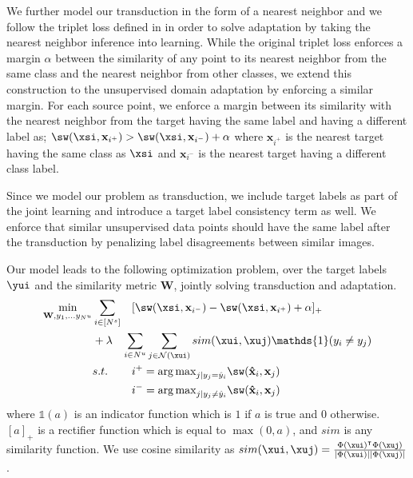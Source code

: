 We further model our transduction in the form of a nearest neighbor and we follow the triplet loss defined in \cite{lmnn} in order to solve adaptation by taking the nearest neighbor inference into learning. While the original triplet loss \cite{lmnn} enforces a margin $\alpha$ between the similarity of any point to its nearest neighbor from the same class and the nearest neighbor from other classes, we extend this construction to the unsupervised domain adaptation by enforcing a similar margin. For each source point, we enforce a margin between its similarity with the nearest neighbor from the target having the same label and having a different label as; $ \sw(\xsi,\mathbf{x}_{i^+}) > \sw(\xsi,\mathbf{x}_{i^-}) + \alpha$ where $\mathbf{x}_{i^+}$ is the nearest target having the same class as $\xsi$ and $\mathbf{x}_{i^-}$ is the nearest target having a different class label.

Since we model our problem as transduction, we include target labels as part of the joint learning and introduce a target label consistency term as well. We enforce that similar unsupervised data points should have the same label after the transduction by penalizing label disagreements between similar images.

Our model leads to the following optimization problem, over the target labels $\yui$ and the similarity metric $\mathbf{W}$, jointly solving transduction and adaptation. 
\begin{equation}
\begin{aligned}
\min_{\mathbf{W}, y_1, \ldots y_{N^u}} &\sum_{i \in [N^s]} &&[\sw(\xsi,\mathbf{x}_{i^-}) - \sw(\xsi,\mathbf{x}_{i^+}) + \alpha]_{+}  \\
&+\lambda &&\hspace{-3mm}\sum_{i \in N^u} \sum_{j \in \mathcal{N}(\xui)}  sim(\xui, \xuj) \mathds{1}(y_i \neq y_j)\\
&s.t. \quad &&i^{+} = {\arg\max}_{j | y_j = \hat{y}_i} \sw(\mathbf{\hat{x}}_i,\mathbf{x}_{j}) \\
&\quad &&i^{-} = {\arg\max}_{j | y_j \neq \hat{y}_i} \sw(\mathbf{\hat{x}}_i,\mathbf{x}_{j}) 
\end{aligned}
\label{loss}
\end{equation}
where $\mathds{1}(a)$ is an indicator function which is $1$ if $a$ is true and $0$ otherwise. $[a]_+$ is a rectifier function which is equal to $\max(0, a)$, and $sim$ is any similarity function. We use cosine similarity as $sim(\xui, \xuj)= \frac{\Phi(\xui)^\intercal \Phi(\xuj)}{|\Phi(\xui)||\Phi(\xuj)|}$. 

